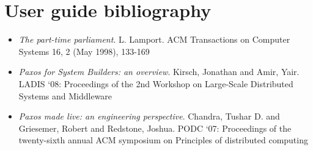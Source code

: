 \section{User guide bibliography}
\label{bibliography:bibliography}\label{bibliography::doc}\begin{itemize}
\item {} 
\emph{The part-time parliament}.
L. Lamport.
ACM Transactions on Computer Systems 16, 2 (May 1998), 133-169

\item {} 
\emph{Paxos for System Builders: an overview}.
Kirsch, Jonathan and Amir, Yair.
LADIS `08: Proceedings of the 2nd Workshop on Large-Scale Distributed Systems and Middleware

\item {} 
\emph{Paxos made live: an engineering perspective}.
Chandra, Tushar D. and Griesemer, Robert and Redstone, Joshua.
PODC `07: Proceedings of the twenty-sixth annual ACM symposium on Principles of distributed computing

\end{itemize}
